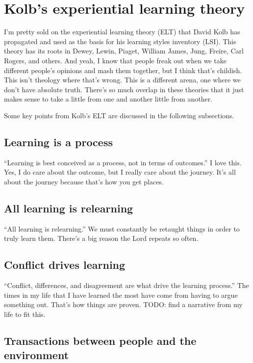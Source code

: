 \documentclass[man,natbib]{apa6}
\begin{document}
\section{Kolb's experiential learning theory}
I'm pretty sold on the experiential learning theory (ELT) that David Kolb has propagated \citep{kolb2005kolb} and used as the basis for his learning styles inventory (LSI). This theory has its roots in Dewey, Lewin, Piaget, William James, Jung, Freire, Carl Rogers, and others. And yeah, I know that people freak out when we take different people's opinions and mash them together, but I think that's childish. This isn't theology where that's wrong. This is a different arena, one where we don't have absolute truth. There's so much overlap in these theories that it just makes sense to take a little from one and another little from another.

Some key points from Kolb's ELT are discussed in the following subsections.
\subsection{Learning is a process}
``Learning is best conceived as a process, not in terms of outcomes.'' I love this. Yes, I do care about the outcome, but I really care about the journey. It's all about the journey because that's how you get places.

\subsection{All learning is relearning}
``All learning is relearning.'' We must constantly be retaught things in order to truly learn them. There's a big reason the Lord repeats so often.

\subsection{Conflict drives learning}
``Conflict, differences, and disagreement are what drive the learning process.'' The times in my life that I have learned the most have come from having to argue something out. That's how things are proven. TODO: find a narrative from my life to fit this.

\subsection{Transactions between people and the environment}
\end{document}
